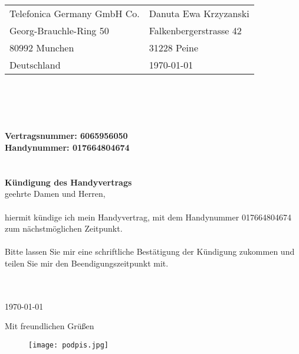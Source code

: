 \documentclass{letter}
\begin{document}
\begin{letter}{}
\begin{tabular}{@{}p{3.0in}l}
 Telefonica Germany GmbH Co.  	& Danuta Ewa Krzyzanski\\
Georg-Brauchle-Ring 50  		& Falkenbergerstrasse 42\\
80992 Munchen    				& 31228 Peine\\
Deutschland				  		& \today
\end{tabular}\\ \\ \\ \\
\bigskip
\textbf{Vertragsnummer: 6065956050}\\
\textbf{Handynummer: 017664804674}\\
\\
\\
\Large\textbf{K\"undigung des Handyvertrags}\\
\bigskip
\normalsize
\Sehr geehrte Damen und Herren, \\\\
hiermit kündige ich mein Handyvertrag, mit dem Handynummer 017664804674\\ zum nächstmöglichen Zeitpunkt.\\\\
Bitte lassen Sie mir eine schriftliche Bestätigung der Kündigung zukommen und teilen Sie mir den Beendigungszeitpunkt mit.\\ \\
\\
\bigskip

\today
 
\closing{Mit freundlichen Grüßen}
\begin{figure}
  \texttt{[image: podpis.jpg]}
\end{figure}



\end{letter}
\end{document}
